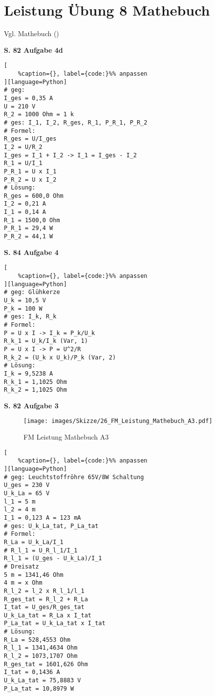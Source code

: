 \section{Leistung Übung 8
Mathebuch}\label{leistung-uebung-8-mathebuch}

Vgl. Mathebuch (\textcite{elbl:2016:technMa})

\textbf{S. 82 Aufgabe 4d}

\lstset{language=Python}%
\begin{lstlisting}[
	%caption={}, label={code:}%% anpassen
][language=Python]
# geg:
I_ges = 0,35 A
U = 210 V
R_2 = 1000 Ohm = 1 k
# ges: I_1, I_2, R_ges, R_1, P_R_1, P_R_2
# Formel:
R_ges = U/I_ges
I_2 = U/R_2
I_ges = I_1 + I_2 -> I_1 = I_ges - I_2
R_1 = U/I_1
P_R_1 = U x I_1
P_R_2 = U x I_2
# Lösung:
R_ges = 600,0 Ohm
I_2 = 0,21 A
I_1 = 0,14 A
R_1 = 1500,0 Ohm
P_R_1 = 29,4 W
P_R_2 = 44,1 W
\end{lstlisting}

\textbf{S. 84 Aufgabe 4}

\lstset{language=Python}%
\begin{lstlisting}[
	%caption={}, label={code:}%% anpassen
][language=Python]
# geg: Glühkerze
U_k = 10,5 V
P_k = 100 W
# ges: I_k, R_k
# Formel:
P = U x I -> I_k = P_k/U_k
R_k_1 = U_k/I_k (Var, 1)
P = U x I -> P = U^2/R
R_k_2 = (U_k x U_k)/P_k (Var, 2)
# Lösung:
I_k = 9,5238 A
R_k_1 = 1,1025 Ohm
R_k_2 = 1,1025 Ohm
\end{lstlisting}

\newpage

\textbf{S. 82 Aufgabe 3}

\begin{figure}[!ht]%
\centering
\texttt{[image: images/Skizze/26\_FM\_Leistung\_Mathebuch\_A3.pdf]}
\caption{FM Leistung Mathebuch A3}
\end{figure}

\lstset{language=Python}%
\begin{lstlisting}[
	%caption={}, label={code:}%% anpassen
][language=Python]
# geg: Leuchtstoffröhre 65V/8W Schaltung
U_ges = 230 V
U_k_La = 65 V
l_1 = 5 m
l_2 = 4 m
I_1 = 0,123 A = 123 mA
# ges: U_k_La_tat, P_La_tat
# Formel:
R_La = U_k_La/I_1
# R_l_1 = U_R_l_1/I_1
R_l_1 = (U_ges - U_k_La)/I_1
# Dreisatz
5 m = 1341,46 Ohm
4 m = x Ohm
R_l_2 = l_2 x R_l_1/l_1
R_ges_tat = R_l_2 + R_La
I_tat = U_ges/R_ges_tat
U_k_La_tat = R_La x I_tat
P_La_tat = U_k_La_tat x I_tat
# Lösung:
R_La = 528,4553 Ohm
R_l_1 = 1341,4634 Ohm
R_l_2 = 1073,1707 Ohm
R_ges_tat = 1601,626 Ohm
I_tat = 0,1436 A
U_k_La_tat = 75,8883 V
P_La_tat = 10,8979 W
\end{lstlisting}
